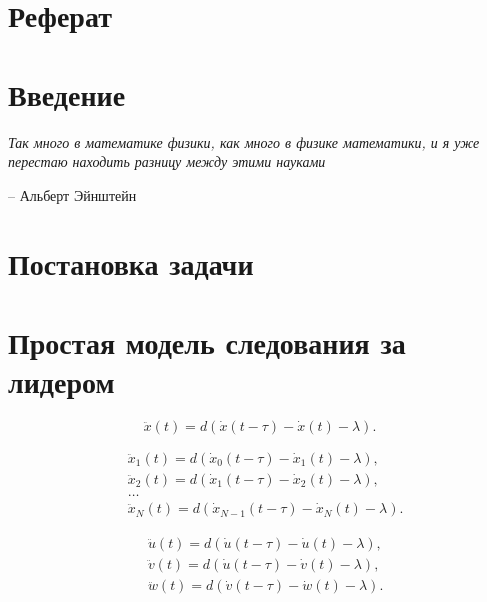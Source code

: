 \documentclass[12pt, a4paper]{extarticle}
\numberwithin{equation}{section}
\begin{document}
\justify 
\setlength{\parindent}{1.25cm} 
\newpage 
\thispagestyle{empty} 
\setcounter{page}{2} 
\section*{Реферат}
\vspace{\baselineskip}	

\newpage

\setcounter{page}{2}

\tableofcontents 
\newpage 

\section*{Введение}
\epigraph{\textit{Так много в математике физики, как много в физике математики, и я уже перестаю находить разницу между этими науками}}
{-- Альберт Эйнштейн}
 
\newpage

\section{Постановка задачи} 
  

\newpage

\section{Простая модель следования за лидером}

\begin{equation*}
\ddot{x}(t) = d (\dot{x}(t-\tau)-\dot{x}(t) - \lambda).
\end{equation*}

\begin{equation*}
\begin{split}
&\ddot{x}_1(t) = d (\dot{x}_0(t-\tau)-\dot{x}_1(t) - \lambda), \\ 
&\ddot{x}_2(t) = d (\dot{x}_1(t-\tau)-\dot{x}_2(t) - \lambda), \\
&\ldots \\
&\ddot{x}_N(t) = d (\dot{x}_{N-1}(t-\tau)-\dot{x}_N(t) - \lambda).
\end{split}
\end{equation*}

\begin{equation*}
\begin{split}
&\ddot{u}(t) = d (\dot{u}(t-\tau)-\dot{u}(t) - \lambda), \\ 
&\ddot{v}(t) = d (\dot{u}(t-\tau)-\dot{v}(t) - \lambda), \\
&\ddot{w}(t) = d (\dot{v}(t-\tau)-\dot{w}(t) - \lambda).
\end{split}
\end{equation*}
\end{document}

